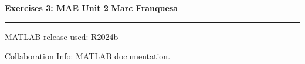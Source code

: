 \documentclass[a4paper,12pt]{report}
\begin{document}
{\Large{\textbf{Exercises 3: MAE Unit 2}} \hfill \textbf{Marc Franquesa}}
\hrule
\vspace{0.5cm}

MATLAB release used: R2024b

Collaboration Info: MATLAB documentation.

\bigskip

\begin{exlist}
    
\end{exlist}
\end{document}
